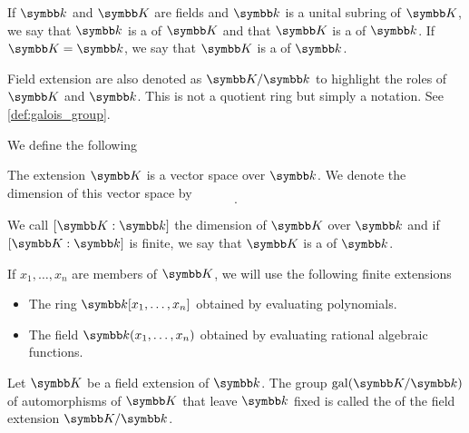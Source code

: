 \begin{definition}\label{def:field_extension}
  If \( \Kl \) and \( \K \) are fields and \( \Kl \) is a unital subring of \( \K \), we say that \( \Kl \) is a  of \( \K \) and that \( \K \) is a  of \( \Kl \). If \( \K = \Kl \), we say that \( \K \) is a  of \( \Kl \).

  Field extension are also denoted as \( \K / \Kl \) to highlight the roles of \( \K \) and \( \Kl \). This is not a quotient ring but simply a notation. See \cref{def:galois_group}.

  We define the following
  \begin{defenum}
     The extension \( \K \) is a vector space over \( \Kl \). We denote the dimension of this vector space by
    \begin{equation*}
      [\K : \Kl].
    \end{equation*}

    We call \( [\K : \Kl] \) the dimension of \( \K \) over \( \Kl \) and if \( [\K : \Kl] \) is finite, we say that \( \K \) is a  of \( \Kl \).

     If \( x_1, \ldots, x_n \) are members of \( \K \), we will use the following finite extensions
    \begin{itemize}
      \item The ring \( \Kl[x_1, \ldots, x_n] \) obtained by evaluating polynomials.
      \item The field \( \Kl(x_1, \ldots, x_n) \) obtained by evaluating rational algebraic functions.
    \end{itemize}
  \end{defenum}
\end{definition}

\begin{definition}\label{def:galois_group}\cite[124]{Knapp2016BAlg}
  Let \( \K \) be a field extension of \( \Kl \). The group \( \Gal(\K / \Kl) \) of automorphisms of \( \K \) that leave \( \Kl \) fixed is called the  of the field extension \( \K / \Kl \).
\end{definition}

